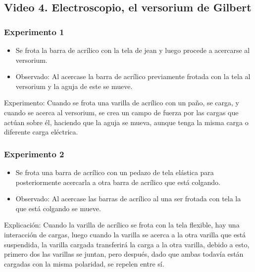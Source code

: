 \documentclass[letterpaper, 12pt]{report}
\begin{document}
\subsection{Video 4. Electroscopio, el versorium de Gilbert}

\subsubsection{Experimento 1}

\begin{itemize}
	\item Se frota la barra de acrílico con la tela de jean y luego procede
	      a acercarse al versorium.

	\item Observado: Al acercase la barra de acrílico previamente frotada
	      con la tela  al versorium y la aguja de este se mueve.
\end{itemize}

Experimento: Cuando se frota una varilla de acrílico con un paño,
se carga, y cuando se acerca al versorium, se crea un campo de fuerza
por las cargas que actúan sobre él, haciendo que la aguja se mueva,
aunque tenga la misma carga o diferente carga eléctrica.
~\cite{GenerarCargaElectrica}

\subsubsection{Experimento 2}

\begin{itemize}
	\item Se frota una barra de acrílico con un pedazo de tela elástica
	      para posteriormente acercarla a otra barra de acrílico que
	      está colgando.

	\item Observado: Al acercase las barras de acrílico al una ser frotada con
	      tela la que está colgando se mueve.
\end{itemize}

Explicación: Cuando la varilla de acrílico se frota con la tela flexible,
hay una interacción de cargas, luego cuando la varilla se acerca a la otra
varilla que está suspendida, la varilla cargada transferirá la carga a la
otra varilla, debido a esto, primero dos las varillas se juntan, pero después,
dado que ambas todavía están cargadas con la misma polaridad, se repelen
entre sí.~\cite{TransferenciaContacto}
\end{document}

